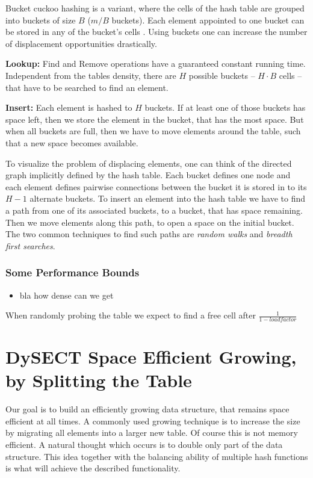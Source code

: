 \documentclass[a4paper,UKenglish]{lipics-v2016}
\begin{document}
Bucket cuckoo hashing is a variant, where the cells of the hash table
are grouped into buckets of size $B$ ($m/B$ buckets).  Each element
appointed to one bucket can be stored in any of the bucket's cells .
Using buckets one can increase the number of displacement
opportunities drastically.

\textbf{Lookup:} Find and Remove operations have a guaranteed constant
running time. Independent from the tables density, there are $H$
possible buckets -- $H\cdot B$ cells -- that have to be searched to
find an element.

\textbf{Insert:} Each element is hashed to $H$ buckets.  If at least
one of those buckets has space left, then we store the element in the
bucket, that has the most space.  But when all buckets are full, then we
have to move elements around the table, such that a new space becomes
available.

To visualize the problem of displacing elements, one can think of the
directed graph implicitly defined by the hash table.  Each bucket
defines one node and each element defines pairwise connections between
the bucket it is stored in to its $H-1$ alternate buckets.  To insert
an element into the hash table we have to find a path from one of its
associated buckets, to a bucket, that has space remaining.  Then we
move elements along this path, to open a space on the initial bucket.
The two common techniques to find such paths are \emph{random walks} and
\emph{breadth first searches}.

\subsubsection*{Some Performance Bounds}
\begin{itemize}
\item bla how dense can we get
\end{itemize}

When randomly probing the table we expect to find a free cell after $\frac{1}{1-load factor}$

\section{DySECT Space Efficient Growing, by Splitting the Table}
Our goal is to build an efficiently growing data structure, that
remains space efficient at all times.  A commonly used growing
technique is to increase the size by migrating all elements
into a larger new table.  Of course this is
not memory efficient.  A natural thought which occurs is to double
only part of the data structure.  This idea together with the
balancing ability of multiple hash functions is what will achieve the
described functionality.
\end{document}

